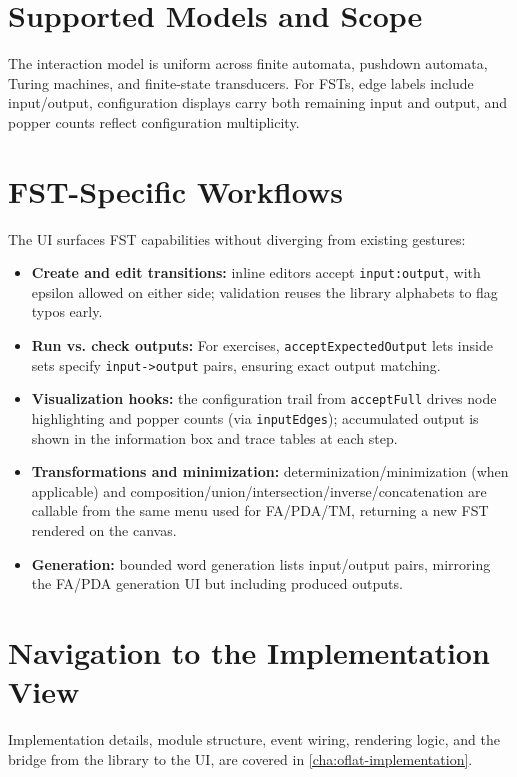 \section{Supported Models and Scope}
\label{sec:oflatdesign_models}
The interaction model is uniform across finite automata, pushdown automata, Turing machines, and finite-state transducers.
For FSTs, edge labels include input/output, configuration displays carry both remaining input and output, and popper counts
reflect configuration multiplicity.

\section{FST-Specific Workflows}
\label{sec:oflatdesign_fstworkflows}
The UI surfaces FST capabilities without diverging from existing gestures:
\begin{itemize}
  \item \textbf{Create and edit transitions:} inline editors accept \texttt{input:output}, with epsilon allowed on either side; 
  validation reuses the library alphabets to flag typos early.
  \item \textbf{Run vs. check outputs:} For exercises, \texttt{acceptExpectedOutput} lets inside sets specify \texttt{input->output} pairs, ensuring 
  exact output matching.
  \item \textbf{Visualization hooks:} the configuration trail from \texttt{acceptFull} drives node highlighting and popper counts 
  (via \texttt{inputEdges}); accumulated output is shown in the information box and trace tables at each step.
  \item \textbf{Transformations and minimization:} determinization/minimization (when applicable) and 
  composition/union/intersection/inverse/concatenation are callable from the same menu used for FA/PDA/TM, 
  returning a new FST rendered on the canvas.
  \item \textbf{Generation:} bounded word generation lists input/output pairs, mirroring the FA/PDA generation UI but including produced 
  outputs.
\end{itemize}

\section{Navigation to the Implementation View}
\label{sec:oflatdesign_nav}
Implementation details, module structure, event wiring, rendering logic, and the bridge from the library to the UI, are
covered in \autoref{cha:oflat-implementation}.